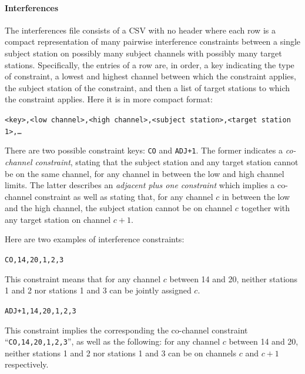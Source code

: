 \documentclass[
10pt, %
letterpaper, %
oneside, %
headinclude,footinclude, %
BCOR5mm, %
needspace, %
]{scrartcl}
\begin{document}
\paragraph{Interferences} The interferences file consists of a CSV with no header where each row is a compact representation of many pairwise interference constraints between a single subject station on possibly many subject channels with possibly many target stations. Specifically, the entries of a row are, in order, a key indicating the type of constraint, a lowest and highest channel between which the constraint applies, the subject station of the constraint, and then a list of target stations to which the constraint applies. Here it is in more compact format:
\begin{center}
\texttt{<key>,<low channel>,<high channel>,<subject station>,<target station 1>,\ldots}
\end{center}
There are two possible constraint keys: \texttt{CO} and \texttt{ADJ+1}. The former indicates a \emph{co-channel constraint}, stating that the subject station and any target station cannot be on the same channel, for any channel in between the low and high channel limits. The latter describes an \emph{adjacent plus one constraint} which implies a co-channel constraint as well as stating that, for any channel $c$ in between the low and the high channel, the subject station cannot be on channel $c$ together with any target station on channel $c+1$.

Here are two examples of interference constraints:
\begin{center}
\texttt{CO,14,20,1,2,3}
\end{center}
This constraint means that for any channel $c$ between 14 and 20, neither stations 1 and 2 nor stations 1 and 3 can be jointly assigned $c$.
\begin{center}
\texttt{ADJ+1,14,20,1,2,3}
\end{center}
This constraint implies the corresponding the co-channel constraint ``\texttt{CO,14,20,1,2,3}'', as well as the following: for any channel $c$ between 14 and 20, neither stations 1 and 2 nor stations 1 and 3 can be on channels $c$ and $c+1$ respectively.
\end{document}
